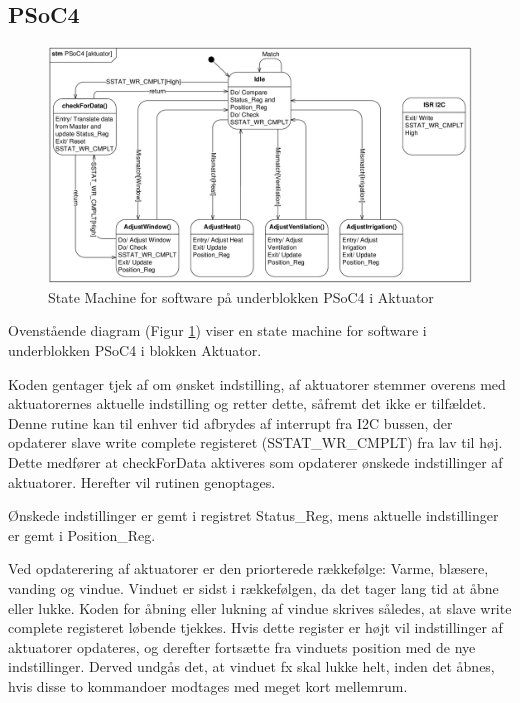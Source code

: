 \clearpage


\subsection{PSoC4}

\begin{figure}[h]
\centering 
\includegraphics[width={\textwidth}, trim=0 0 0 0, clip=true] {../fig/stm_psoc_aktuator.pdf}
\caption{State Machine for software på underblokken PSoC4 i Aktuator}
\label{fig:stm_psoc_aktuator}
\end{figure}

Ovenstående diagram (Figur \ref{fig:stm_psoc_aktuator}) viser en state machine for software i underblokken PSoC4 i blokken Aktuator. 

Koden gentager tjek af om ønsket indstilling, af aktuatorer stemmer overens med aktuatorernes aktuelle indstilling og retter dette, såfremt det ikke er tilfældet. 
Denne rutine kan til enhver tid afbrydes af interrupt fra I2C bussen, der opdaterer slave write complete registeret (SSTAT\_WR\_CMPLT) fra lav til høj. Dette medfører at checkForData aktiveres som opdaterer ønskede indstillinger af aktuatorer. Herefter vil rutinen genoptages.
 
Ønskede indstillinger er gemt i registret Status\_Reg, mens aktuelle indstillinger er gemt i Position\_Reg.
 
Ved opdaterering af aktuatorer er den priorterede rækkefølge: Varme, blæsere, vanding og vindue. 
Vinduet er sidst i rækkefølgen, da det tager lang tid at åbne eller lukke. Koden for åbning eller lukning af vindue skrives således, at slave write complete registeret løbende tjekkes. Hvis dette register er højt vil indstillinger af aktuatorer opdateres, og derefter fortsætte fra vinduets position med de nye indstillinger.
Derved undgås det, at vinduet fx skal lukke helt, inden det åbnes, hvis disse to kommandoer modtages med meget kort mellemrum. 

